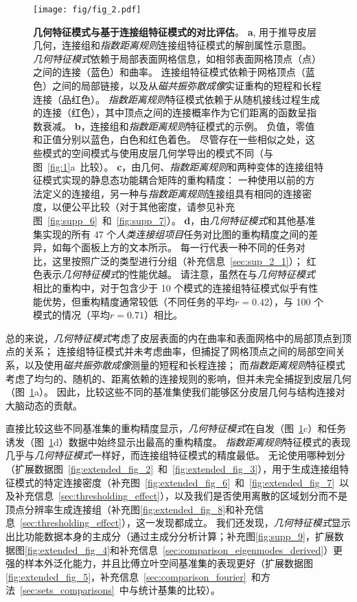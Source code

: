\documentclass[lang=cn,a4paper,newtx,citestyle=gb7714-2015, bibstyle=gb7714-2015]{elegantpaper}
\begin{document}
\begin{figure}[!htb]
	\centering
	\texttt{[image: fig/fig\_2.pdf]}
	\caption{\textbf{几何特征模式与基于连接组特征模式的对比评估}。
		\textbf{a}, 用于推导皮层几何，连接组和\textit{指数距离规则}连接组特征模式的解剖属性示意图。
		\textit{几何特征模式}依赖于局部表面网格信息，如相邻表面网格顶点（点）之间的连接（蓝色）和曲率。
		连接组特征模式依赖于网格顶点（蓝色）之间的局部链接，以及从\textit{磁共振弥散成像}实证重构的短程和长程连接（品红色）。
		\textit{指数距离规则}特征模式依赖于从随机接线过程生成的连接（红色），其中顶点之间的连接概率作为它们距离的函数呈指数衰减。
		\textbf{b}，连接组和\textit{指数距离规则}特征模式的示例。
		负值，零值和正值分别以蓝色，白色和红色着色。
		尽管存在一些相似之处，这些模式的空间模式与使用皮层几何学导出的模式不同（与图~\ref{fig:1}a~比较）。
		\textbf{c}，由几何、\textit{指数距离规则}和两种变体的连接组特征模式实现的静息态功能耦合矩阵的重构精度：
		一种使用以前的方法\cite{naze2021robustness}定义的连接组，另一种与\textit{指数距离规则}连接组具有相同的连接密度，以便公平比较（对于其他密度，请参见补充图~\ref{fig:supp_6}~和~\ref{fig:supp_7}）。
		\textbf{d}，由\textit{几何特征模式}和其他基准集实现的所有 47 个\textit{人类连接组项目}任务对比图的重构精度之间的差异，如每个面板上方的文本所示。
		每一行代表一种不同的任务对比，这里按照广泛的类型进行分组（补充信息~\ref{sec:sup_2_1}）；
		红色表示\textit{几何特征模式}的性能优越。
		请注意，虽然在与\textit{几何特征模式}相比的重构中，对于包含少于 10 个模式的连接组特征模式似乎有性能优势，但重构精度通常较低（不同任务的平均$ r = 0.42 $），与 100 个模式的情况（平均$ r = 0.71 $）相比。
	} \label{fig:2}
\end{figure}


总的来说，\textit{几何特征模式}考虑了皮层表面的内在曲率和表面网格中的局部顶点到顶点的关系；
连接组特征模式并未考虑曲率，但捕捉了网格顶点之间的局部空间关系，以及使用\textit{磁共振弥散成像}测量的短程和长程连接；
而\textit{指数距离规则}特征模式考虑了均匀的、随机的、距离依赖的连接规则的影响，但并未完全捕捉到皮层几何（图~\ref{fig:2}a）。
因此，比较这些不同的基准集使我们能够区分皮层几何与结构连接对大脑动态的贡献。


直接比较这些不同基准集的重构精度显示，\textit{几何特征模式}在自发（图~\ref{fig:2}c）和任务诱发（图~\ref{fig:2}d）数据中始终显示出最高的重构精度。
\textit{指数距离规则}特征模式的表现几乎与\textit{几何特征模式}一样好，而连接组特征模式的精度最低。
无论使用哪种划分（扩展数据图~\ref{fig:extended_fig_2}~和~\ref{fig:extended_fig_3}），用于生成连接组特征模式的特定连接密度（补充图~\ref{fig:extended_fig_6}~和~\ref{fig:extended_fig_7}~以及补充信息~\ref{sec:thresholding_effect}），以及我们是否使用离散的区域划分而不是顶点分辨率生成连接组（补充图\ref{fig:extended_fig_8}和补充信息~\ref{sec:thresholding_effect}），这一发现都成立。
我们还发现，\textit{几何特征模式}显示出比功能数据本身的主成分（通过主成分分析计算；补充图\ref{fig:supp_9}，扩展数据图\ref{fig:extended_fig_4}和补充信息~\ref{sec:comparison_eigenmodes_derived}）更强的样本外泛化能力，并且比傅立叶空间基准集的表现更好（扩展数据图\ref{fig:extended_fig_5}，补充信息~\ref{sec:comparison_fourier}~和方法~\ref{sec:sets_comparisons}~中与统计基集的比较）。
\end{document}
